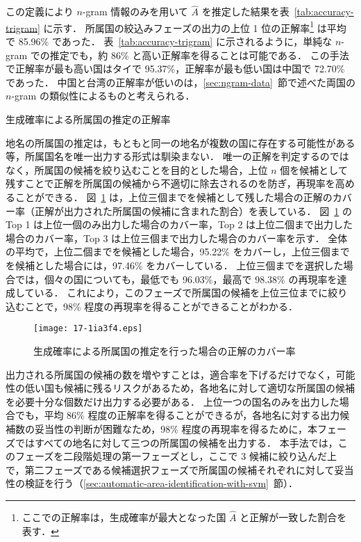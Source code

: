 \documentclass[japanese]{jnlp_1.4}
\begin{document}
この定義により $n$-gram 情報のみを用いて $\hat{A}$ を推定した結果を表~\ref{tab:accuracy-trigram} に示す．
所属国の絞込みフェーズの出力の上位 1 位の正解率\footnote{ここでの正解率は，生成確率が最大となった国 $\hat{A}$ と正解が一致した割合を表す．} は平均で 85.96\% であった．
表~\ref{tab:accuracy-trigram} に示されるように，単純な $n$-gram での推定でも，約 86\% と高い正解率を得ることは可能である．
この手法で正解率が最も高い国はタイで 95.37\%，正解率が最も低い国は中国で 72.70\% であった．
中国と台湾の正解率が低いのは，\ref{sec:ngram-data}~節で述べた両国の $n$-gram の類似性によるものと考えられる．

\begin{table}[b]
 \caption{生成確率による所属国の推定の正解率}
 \label{tab:accuracy-trigram}

\end{table}

地名の所属国の推定は，もともと同一の地名が複数の国に存在する可能性がある等，所属国名を唯一出力する形式は馴染まない．
唯一の正解を判定するのではなく，所属国の候補を絞り込むことを目的とした場合，上位 $n$ 個を候補として残すことで正解を所属国の候補から不適切に除去されるのを防ぎ，再現率を高めることができる．
図~\ref{fig:ngram-coverage} は，上位三個までを候補として残した場合の正解のカバー率（正解が出力された所属国の候補に含まれた割合）を表している．
図~\ref{fig:ngram-coverage} の Top 1 は上位一個のみ出力した場合のカバー率，Top 2 は上位二個まで出力した場合のカバー率，Top 3 は上位三個まで出力した場合のカバー率を示す．
全体の平均で，上位二個までを候補とした場合，95.22\% をカバーし，上位三個までを候補とした場合には，97.46\% をカバーしている．
上位三個までを選択した場合では，個々の国についても，最低でも 96.03\%，最高で 98.38\% の再現率を達成している．
これにより，このフェーズで所属国の候補を上位三位までに絞り込むことで，98\% 程度の再現率を得ることができることがわかる．

\begin{figure}[t]
 \begin{center}
  \texttt{[image: 17-1ia3f4.eps]}
 \end{center}
  \caption{生成確率による所属国の推定を行った場合の正解のカバー率}
  \label{fig:ngram-coverage}
\end{figure}

出力される所属国の候補の数を増やすことは，適合率を下げるだけでなく，可能性の低い国も候補に残るリスクがあるため，各地名に対して適切な所属国の候補を必要十分な個数だけ出力する必要がある．
上位一つの国名のみを出力した場合でも，平均 86\% 程度の正解率を得ることができるが，各地名に対する出力候補数の妥当性の判断が困難なため，98\% 程度の再現率を得るために，本フェーズではすべての地名に対して三つの所属国の候補を出力する．
本手法では，このフェーズを二段階処理の第一フェーズとし，ここで 3 候補に絞り込んだ上で，第二フェーズである候補選択フェーズで所属国の候補それぞれに対して妥当性の検証を行う（\ref{sec:automatic-area-identification-with-svm}~節）．
\end{document}
